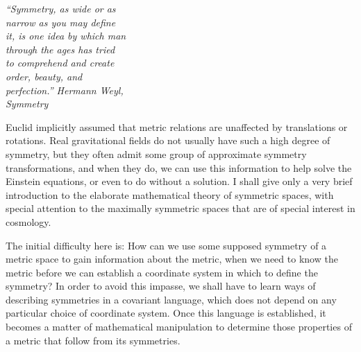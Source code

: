 
\begin{flushright}
\begin{minipage}{0.46\textwidth}
\itshape
``Symmetry, as wide or as\\
narrow as you may define\\
it, is one idea by which man\\
through the ages has tried\\
to comprehend and create\\
order, beauty, and\\
perfection.'' Hermann Weyl,\\
\emph{Symmetry}
\end{minipage}
\end{flushright}

Euclid implicitly assumed that metric relations are unaffected by translations
or rotations. Real gravitational fields do not usually have such a high degree
of symmetry, but they often admit some group of approximate symmetry
transformations, and when they do, we can use this information to help solve
the Einstein equations, or even to do without a solution. I shall give only a
very brief introduction to the elaborate mathematical theory of symmetric
spaces, with special attention to the maximally symmetric spaces that are of
special interest in cosmology.

The initial difficulty here is: How can we use some supposed symmetry of a
metric space to gain information about the metric, when we need to know the
metric before we can establish a coordinate system in which to define the
symmetry? In order to avoid this impasse, we shall have to learn ways of
describing symmetries in a covariant language, which does not depend on any
particular choice of coordinate system. Once this language is established, it
becomes a matter of mathematical manipulation to determine those properties of
a metric that follow from its symmetries.
